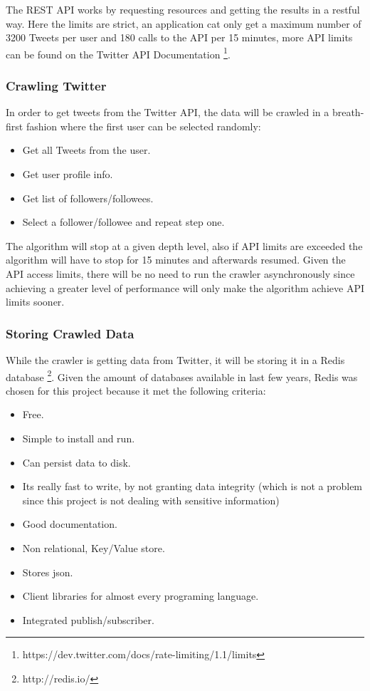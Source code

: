  The REST API works by requesting resources and getting the results in a restful way. Here the limits are strict, an application cat only get a maximum number of 3200 Tweets per user and 180 calls to the API per 15 minutes, more API limits can be found on the Twitter API Documentation \footnote{https://dev.twitter.com/docs/rate-limiting/1.1/limits}.

\subsubsection{Crawling Twitter} %
\label{sub:crawling_twitter}
In order to get tweets from the Twitter API, the data will be crawled in a breath-first fashion where the first user can be selected randomly:

\begin{itemize}
  \item Get all Tweets from the user.
  \item Get user profile info.
  \item Get list of followers/followees.
  \item Select a follower/followee and repeat step one.
\end{itemize}

The algorithm will stop at a given depth level, also if API limits are exceeded the algorithm will have to stop for 15 minutes and afterwards resumed. Given the API access limits, there will be no need to run the crawler asynchronously since achieving a greater level of performance will only make the algorithm achieve API limits sooner.

\subsubsection{Storing Crawled Data} %
\label{sub:storing_crawled_data}
While the crawler is getting data from Twitter, it will be storing it in a Redis database \footnote{http://redis.io/}. Given the amount of databases available in last few years, Redis was chosen for this project because it met the following criteria:
\begin{itemize}
  \item Free.
  \item Simple to install and run. 
  \item Can persist data to disk.
  \item Its really fast to write, by not granting data integrity (which is not a problem since this project is not dealing with sensitive information)
  \item Good documentation.
  \item Non relational, Key/Value store.
  \item Stores json.
  \item Client libraries for almost every programing language.
  \item Integrated publish/subscriber.
\end{itemize}

